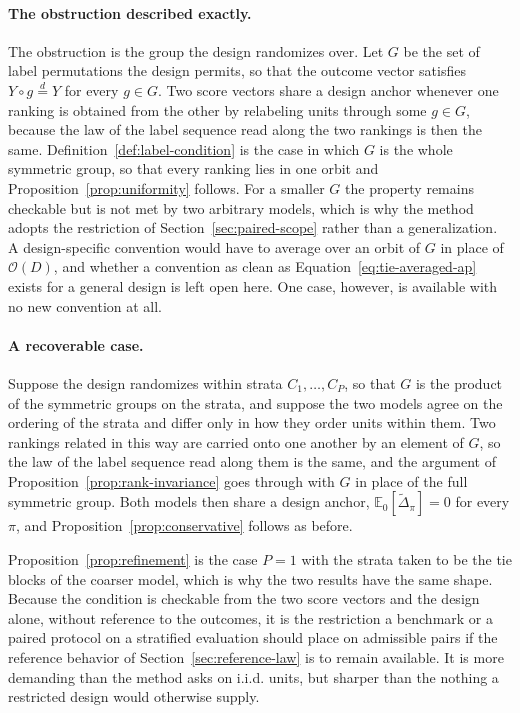 \documentclass[11pt]{article}
\newcommand{\E}{\mathbb{E}}
\newcommand{\Dta}{\widetilde{\Delta}}
\theoremstyle{remark}
\begin{document}
\paragraph{The obstruction described exactly.}
The obstruction is the group the design randomizes over. Let $G$ be the set of label permutations the design permits, so that the outcome vector satisfies $Y\circ g\overset{d}{=}Y$ for every $g\in G$. Two score vectors share a design anchor whenever one ranking is obtained from the other by relabeling units through some $g\in G$, because the law of the label sequence read along the two rankings is then the same. Definition~\ref{def:label-condition} is the case in which $G$ is the whole symmetric group, so that every ranking lies in one orbit and Proposition~\ref{prop:uniformity} follows. For a smaller $G$ the property remains checkable but is not met by two arbitrary models, which is why the method adopts the restriction of Section~\ref{sec:paired-scope} rather than a generalization. A design-specific convention would have to average over an orbit of $G$ in place of $\mathcal{O}(D)$, and whether a convention as clean as Equation~\eqref{eq:tie-averaged-ap} exists for a general design is left open here. One case, however, is available with no new convention at all.

\paragraph{A recoverable case.}
Suppose the design randomizes within strata $C_1,\ldots,C_P$, so that $G$ is the product of the symmetric groups on the strata, and suppose the two models agree on the ordering of the strata and differ only in how they order units within them. Two rankings related in this way are carried onto one another by an element of $G$, so the law of the label sequence read along them is the same, and the argument of Proposition~\ref{prop:rank-invariance} goes through with $G$ in place of the full symmetric group. Both models then share a design anchor, $\E_0[\Dta_\pi]=0$ for every $\pi$, and Proposition~\ref{prop:conservative} follows as before.

Proposition~\ref{prop:refinement} is the case $P=1$ with the strata taken to be the tie blocks of the coarser model, which is why the two results have the same shape. Because the condition is checkable from the two score vectors and the design alone, without reference to the outcomes, it is the restriction a benchmark or a paired protocol on a stratified evaluation should place on admissible pairs if the reference behavior of Section~\ref{sec:reference-law} is to remain available. It is more demanding than the method asks on i.i.d. units, but sharper than the nothing a restricted design would otherwise supply.
\end{document}
